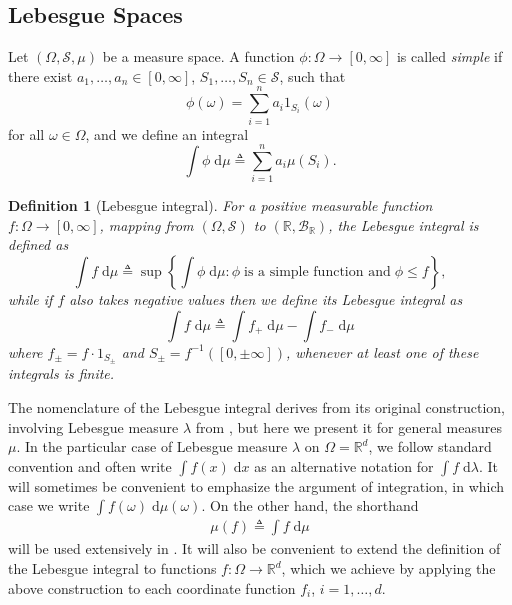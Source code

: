 \documentclass[12pt,paper=letter]{scrreprt}
\newtheorem{definition}{Definition}[chapter]
\def\defeq{\triangleq} %
\begin{document}
\subsection{Lebesgue Spaces}
\label{subsec: lebesgue spaces}

Let $(\Omega,\mathcal{S},\mu)$ be a measure space.
A function $\phi : \Omega \rightarrow [0,\infty]$ is called \emph{simple} if there exist $a_1,\dots,a_n \in [0,\infty]$, $S_1,\dots,S_n \in \mathcal{S}$, such that
$$
\phi(\omega) = \sum_{i=1}^n a_i \mathrm{1}_{S_i}(\omega)
$$
for all $\omega \in \Omega$, and we define an integral
$$
\int \phi \; \mathrm{d}\mu \defeq \sum_{i=1}^n a_i \mu(S_i) .
$$

\begin{definition}[Lebesgue integral]
For a positive measurable function $f : \Omega \rightarrow [0,\infty]$, mapping from $(\Omega,\mathcal{S})$ to $(\mathbb{R} , \mathcal{B}_{\mathbb{R}})$, the \emph{Lebesgue integral} is defined as
$$
\int f \; \mathrm{d} \mu \defeq \sup\left\{ \int \phi \; \mathrm{d}\mu : \phi \; \text{is a simple function and} \; \phi \leq f \right\} ,
$$
while if $f$ also takes negative values then we define its Lebesgue integral as
$$
\int f \; \mathrm{d}\mu \defeq \int f_+ \; \mathrm{d}\mu - \int f_- \; \mathrm{d}\mu
$$
where $f_\pm = f \cdot 1_{S_\pm}$ and $S_\pm = f^{-1}([0,\pm \infty])$, whenever at least one of these integrals is finite.
\end{definition}


The nomenclature of the Lebesgue integral derives from its original construction, involving Lebesgue measure $\lambda$ from , but here we present it for general measures $\mu$.
In the particular case of Lebesgue measure $\lambda$ on $\Omega = \mathbb{R}^d$, we follow standard convention and often write $\int f(x) \; \mathrm{d}x$ as an alternative notation for $\int f \; \mathrm{d}\lambda$.
It will sometimes be convenient to emphasize the argument of integration, in which case we write $\int f(\omega) \; \mathrm{d}\mu(\omega)$.
On the other hand, the shorthand
\begin{align}
\mu(f) \defeq \int f \; \mathrm{d}\mu \label{eq: int short}
\end{align}
will be used extensively in .
It will also be convenient to extend the definition of the Lebesgue integral to functions $f : \Omega \rightarrow \mathbb{R}^d$, which we achieve by applying the above construction to each coordinate function $f_i$, $i = 1,\dots,d$.
\end{document}
